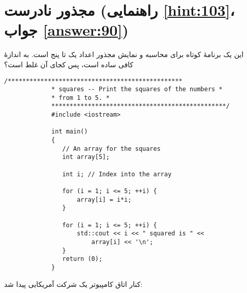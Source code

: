 \section[مجذور نادرست]{مجذور نادرست \protect{} (راهنمایی \ref{hint:103}، جواب \ref{answer:90})}
این یک برنامهٔ کوتاه برای محاسبه و نمایش مجذور اعداد یک تا پنج است. به اندازهٔ کافی ساده است، پس کجای آن غلط است؟

\begin{LTR}
        \begin{lstlisting}[style=C++Style]
             /************************************************
             * squares -- Print the squares of the numbers *
             * from 1 to 5. *
             ************************************************/
             #include <iostream>

             int main()
             {
             	// An array for the squares
             	int array[5];

             	int i; // Index into the array

             	for (i = 1; i <= 5; ++i) {
             		array[i] = i*i;
             	}

             	for (i = 1; i <= 5; ++i) {
             		std::cout << i << " squared is " <<
             			array[i] << '\n';
             	}
             	return (0);
             }
        \end{lstlisting}
\end{LTR}

\begin{tcolorbox}
    \centering
    کنار اتاق کامپیوتر یک شرکت آمریکایی پیدا شد:


    \small{}
\end{tcolorbox}